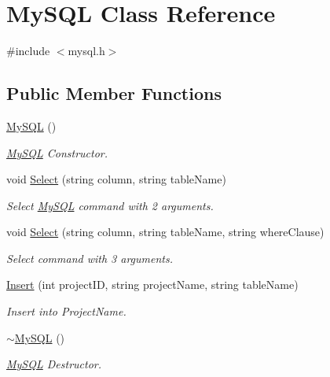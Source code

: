 \hypertarget{classMySQL}{\section{My\-S\-Q\-L Class Reference}
\label{classMySQL}
}


{\ttfamily \#include $<$mysql.\-h$>$}

\subsection*{Public Member Functions}
\begin{DoxyCompactItemize}
\item 
\hyperlink{classMySQL_abc2ca1b4be66f7e588e00dab96d91d43}{My\-S\-Q\-L} ()
\begin{DoxyCompactList}\small\item\em \hyperlink{classMySQL}{My\-S\-Q\-L} Constructor. \end{DoxyCompactList}\item 
void \hyperlink{classMySQL_a95aaf59d01eb141bf2104cde6f4872a8}{Select} (string column, string table\-Name)
\begin{DoxyCompactList}\small\item\em Select \hyperlink{classMySQL}{My\-S\-Q\-L} command with 2 arguments. \end{DoxyCompactList}\item 
void \hyperlink{classMySQL_a7d6ebbeebbf159103c3ade8eff8f3c86}{Select} (string column, string table\-Name, string where\-Clause)
\begin{DoxyCompactList}\small\item\em Select command with 3 arguments. \end{DoxyCompactList}\item 
\hyperlink{classMySQL_ace1ac1b227cc6f1370b6f50f79732386}{Insert} (int project\-I\-D, string project\-Name, string table\-Name)
\begin{DoxyCompactList}\small\item\em Insert into Project\-Name. \end{DoxyCompactList}\item 
\hyperlink{classMySQL_ab27885d0695900ade2b7a0d57375a9bf}{$\sim$\-My\-S\-Q\-L} ()
\begin{DoxyCompactList}\small\item\em \hyperlink{classMySQL}{My\-S\-Q\-L} Destructor. \end{DoxyCompactList}\end{DoxyCompactItemize}
